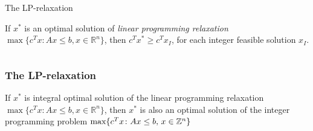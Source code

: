 \begin{frame}
  
\end{frame}

\begin{frame}{The LP-relaxation}
\begin{theorem}
  \label{thr:14}
  If $x^*$ is an  optimal solution of 
  \emph{linear programming 
    relaxation} $\max\{c^Tx \colon Ax\leq b, x ∈ ℝ^n\}$, 
  then $c^T x^* ≥ c^T x_I$, for each integer feasible solution $x_I$. 
\end{theorem}





   \begin{columns}
    \begin{column}{.5\textwidth}
      
    \end{column}
    \begin{column}{.5\textwidth}
      
    \end{column}       
  \end{columns}
\end{frame}



\begin{frame}
  \frametitle{The LP-relaxation}
  

\begin{theorem}
  \label{thr:14}
  If  $x^*$ is integral  optimal solution of the  
  linear programming 
  relaxation $\max\{c^Tx \colon Ax\leq b, x ∈ ℝ^n\}$, then $x^*$ is also an optimal solution of the integer
  programming problem $\max\{c^Tx \colon Ax\leq b, \, x \in \mathbb{Z}^n\}$
\end{theorem}

\end{frame}



